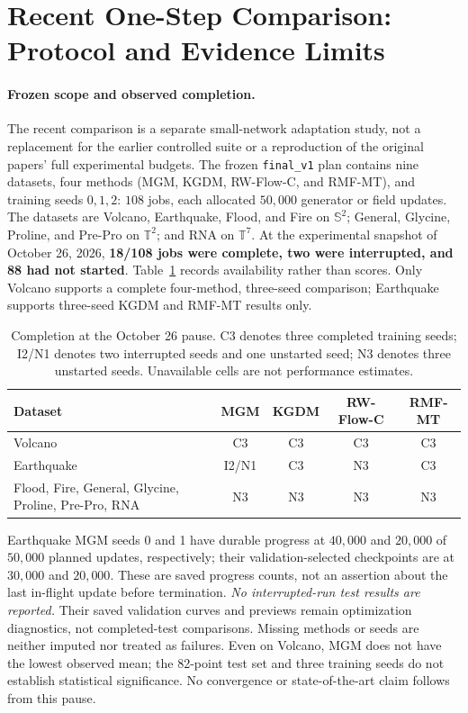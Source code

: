 \section{Recent One-Step Comparison: Protocol and Evidence Limits}
\label{app:recent-protocol}

\paragraph{Frozen scope and observed completion.}
The recent comparison is a separate small-network adaptation study, not a
replacement for the earlier controlled suite or a reproduction of the original
papers' full experimental budgets. The frozen \texttt{final\_v1} plan contains
nine datasets, four methods (MGM, KGDM, RW-Flow-C, and RMF-MT), and training
seeds $0,1,2$: $108$ jobs, each allocated $50{,}000$ generator or field updates.
The datasets are Volcano, Earthquake, Flood, and Fire on $\mathbb S^2$;
General, Glycine, Proline, and Pre-Pro on $\mathbb T^2$; and RNA on
$\mathbb T^7$. At the experimental snapshot of October 26, 2026,
\textbf{18/108 jobs were complete, two were interrupted, and 88 had not
started}. Table~\ref{tab:recent-completion} records availability rather than
scores. Only Volcano supports a complete four-method, three-seed comparison;
Earthquake supports three-seed KGDM and RMF-MT results only.

\begin{table}[t]
\caption{Completion at the October 26 pause. C3 denotes three completed
training seeds; I2/N1 denotes two interrupted seeds and one unstarted seed;
N3 denotes three unstarted seeds. Unavailable cells are not performance estimates.}
\label{tab:recent-completion}
\centering\small
\begin{tabular}{@{}p{.39\linewidth}cccc@{}}
\toprule
Dataset & MGM & KGDM & RW-Flow-C & RMF-MT \\
\midrule
Volcano & C3 & C3 & C3 & C3 \\
Earthquake & I2/N1 & C3 & N3 & C3 \\
Flood, Fire, General, Glycine, Proline, Pre-Pro, RNA
 & N3 & N3 & N3 & N3 \\
\bottomrule
\end{tabular}
\end{table}

Earthquake MGM seeds 0 and 1 have durable progress at $40{,}000$ and $20{,}000$
of $50{,}000$ planned updates, respectively; their validation-selected
checkpoints are at $30{,}000$ and $20{,}000$. These are saved progress counts,
not an assertion about the last in-flight update before termination.
\emph{No interrupted-run test results are reported.} Their saved validation
curves and previews remain optimization diagnostics, not completed-test
comparisons. Missing methods or seeds are neither imputed nor treated as
failures. Even on Volcano, MGM does not have the lowest observed mean; the
82-point test set and three training seeds do not establish statistical
significance. No convergence or state-of-the-art claim follows from this pause.

